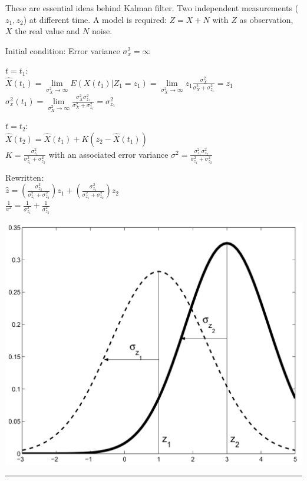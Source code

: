 \begin{minipage}{0.6\textwidth}
These are essential ideas behind Kalman filter. Two independent measurements ($z_1, z_2$) at different time.
A model is required: $Z = X + N$ with $Z$ as observation, $X$ the real value and $N$ noise.
	\begin{liste}
	\item Initial condition: Error variance $\sigma_x^2 = \infty$
	\item $t=t_1$:\\
	$\hat{X}(t_1)=\lim\limits_{\sigma_{X}^2 \rightarrow \infty}{E(X(t_1)|Z_1=z_1)}=\lim\limits_{\sigma_{X}^2 \rightarrow \infty}{z_1\frac{\sigma_X^2}{\sigma_X^2+\sigma_{z_1}^2}}=z_1$\\
	$\sigma_x^2(t_1)=\lim\limits_{\sigma_{X}^2 \rightarrow \infty}{\frac{\sigma_X^2 \sigma_{z_1}^2}{\sigma_X^2 + \sigma_{z_1}^2}}=\sigma_{z_1}^2$
	\item $t=t_2$:\\
	
	$\hat{X}(t_2)=\hat{X}(t_1)+K\left(z_2-\hat{X}(t_1)\right)$\\
	$K=\frac{\sigma_{z_1}^2}{\sigma_{z_1}^2 + \sigma_{z_2}^2}$
	with an associated error variance $\sigma^2=\frac{\sigma_{z_1}^2 \sigma_{z_2}^2}{\sigma_{z_1}^2 + \sigma_{z_2}^2}$
	\item Rewritten:\\
	$\hat{z}=\left(\frac{\sigma_{z_2}^2}{\sigma_{z_1}^2 + \sigma_{z_2}^2}\right)z_1 + \left(\frac{\sigma_{z_1}^2}{\sigma_{z_1}^2 + \sigma_{z_2}^2}\right) z_2$\\
	$\frac{1}{\sigma^2}=\frac{1}{\sigma_{z_1}^2} + \frac{1}{\sigma_{z_2}^2}$
	
	\end{liste}
\end{minipage}
\begin{minipage}{0.4\textwidth}
\includegraphics[width=\linewidth]{./Content/LimitTheorems/TwoMeas}
\end{minipage}

\vspace{2mm}
\hrule

